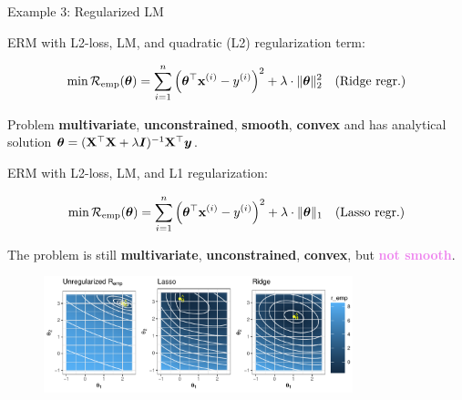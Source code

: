 \documentclass[11pt,compress,t,notes=noshow, xcolor=table]{beamer}
\begin{document}
\begin{vbframe}{Example 3: Regularized LM}

\begin{footnotesize}

ERM with L2-loss, LM, and quadratic (L2) regularization term: 

\vspace*{-0.2cm}

$$
	\min \mathcal{R}_{\text{emp}}(\bm{\theta}) = \sum\limits_{i=1}^n \left(\bm{\theta}^\top \mathbf{x}^{(i)} - y^{(i)}\right)^2  + \lambda \cdot \|\bm{\theta}\|_2^2 \quad \text{(Ridge regr.)}
$$

\vspace*{-0.1cm}


Problem \textbf{multivariate}, \textbf{unconstrained}, \textbf{smooth}, \textbf{convex} and has analytical solution $\bm{\theta} = (\mathbf{X}^\top \mathbf{X} + \lambda \bm{I})^{-1}\mathbf{X}^\top \bm{y}$. 

\vspace*{0.1cm}

ERM with L2-loss, LM, and L1 regularization: 

\vspace*{-0.2cm}

$$
	\min \mathcal{R}_{\text{emp}}(\bm{\theta}) = \sum\limits_{i=1}^n \left(\bm{\theta}^\top \mathbf{x}^{(i)} - y^{(i)}\right)^2  + \lambda \cdot \|\bm{\theta}\|_1 \quad \text{(Lasso regr.)}
$$

\vspace*{-0.1cm}

The problem is still \textbf{multivariate}, \textbf{unconstrained}, \textbf{convex}, but \textcolor{violet}{\textbf{not smooth}}. %

\begin{figure}
\begin{center}
	\includegraphics[width=0.8\textwidth]{figure_man/linreg.pdf}
\end{center}
\end{figure}

\end{footnotesize}

\end{vbframe}
\end{document}
